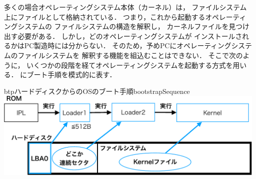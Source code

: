 多くの場合オペレーティングシステム本体（カーネル）は，
ファイルシステム上にファイルとして格納されている．
つまり，これから起動するオペレーティングシステムの
ファイルシステムの構造を解釈し，
カーネルファイルを見つけ出す必要がある．
しかし，どのオペレーティングシステムが
インストールされるかはPC製造時には分からない．
そのため，予めPCにオペレーティングシステムのファイルシステムを
解釈する機能を組込むことはできない．
そこで次のように，
いくつかの段階を経てオペレーティングシステムを起動する方式を用いる．
にブート手順を模式的に表す．

\begin{myfig}{btp}{ハードディスクからのOSのブート手順}{bootstrapSequence}
  \includegraphics[scale=0.66]{Fig/bootstrapSequence-crop.pdf}
\end{myfig}

